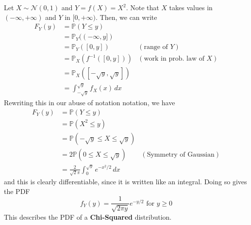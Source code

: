 \documentclass{article}
\begin{document}
      \begin{example}
        Let $X \sim \mathcal{N}(0, 1)$ and $Y = f(X) = X^2$. Note that $X$ takes values in $(-\infty, +\infty)$ and $Y$ in $[0, +\infty)$. Then, we can write 
        \begin{align*}
          F_Y (y) & = \mathbb{P}(Y \leq y) \\ 
          & = \mathbb{P}_Y ( (-\infty, y]) \\
          & = \mathbb{P}_Y (  [0, y]) & (\text{range of } Y) \\
          & = \mathbb{P}_X ( f^{-1} ([0, y]) ) & (\text{work in prob. law of } X) \\
          & = \mathbb{P}_X ( [-\sqrt{y}, \sqrt{y}] ) \\
          & = \int_{-\sqrt{y}}^{\sqrt{y}} f_X (x) \,dx 
        \end{align*}
        Rewriting this in our abuse of notation notation, we have 
        \begin{align*}
          F_Y (y) & = \mathbb{P}(Y \leq y) \\
          & = \mathbb{P}(X^2 \leq y) \\
          & = \mathbb{P}( -\sqrt{y} \leq X \leq \sqrt{y}) \\
          & = 2 \mathbb{P}(0 \leq X \leq \sqrt{y}) & (\text{Symmetry of Gaussian})\\
          & = \frac{2}{\sqrt{2} \pi} \int_0^{\sqrt{y}} e^{-x^2 / 2} \,dx 
        \end{align*}
        and this is clearly differentiable, since it is written like an integral. Doing so gives the PDF
        \begin{equation}
          f_Y (y) = \frac{1}{\sqrt{2 \pi y}} e^{-y/2} \text{ for } y \geq 0
        \end{equation}
        This describes the PDF of a \textbf{Chi-Squared} distribution. 
      \end{example}
\end{document}
